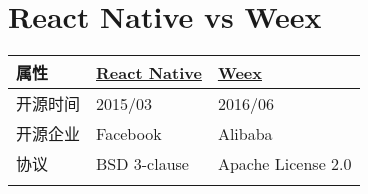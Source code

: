 \section{React Native vs Weex}\label{react-native-vs-weex}

\begin{longtable}[]{@{}lll@{}}
\toprule
\begin{minipage}[b]{0.05\columnwidth}\raggedright\strut
属性\strut
\end{minipage} & \begin{minipage}[b]{0.05\columnwidth}\raggedright\strut
\href{https://github.com/facebook/react-native}{React Native}\strut
\end{minipage} & \begin{minipage}[b]{0.05\columnwidth}\raggedright\strut
\href{https://github.com/apache/incubator-weex/}{Weex}\strut
\end{minipage}\tabularnewline
\midrule
\endhead
\begin{minipage}[t]{0.05\columnwidth}\raggedright\strut
开源时间\strut
\end{minipage} & \begin{minipage}[t]{0.05\columnwidth}\raggedright\strut
2015/03\strut
\end{minipage} & \begin{minipage}[t]{0.05\columnwidth}\raggedright\strut
2016/06\strut
\end{minipage}\tabularnewline
\begin{minipage}[t]{0.05\columnwidth}\raggedright\strut
开源企业\strut
\end{minipage} & \begin{minipage}[t]{0.05\columnwidth}\raggedright\strut
Facebook\strut
\end{minipage} & \begin{minipage}[t]{0.05\columnwidth}\raggedright\strut
Alibaba\strut
\end{minipage}\tabularnewline
\begin{minipage}[t]{0.05\columnwidth}\raggedright\strut
协议\strut
\end{minipage} & \begin{minipage}[t]{0.05\columnwidth}\raggedright\strut
BSD 3-clause\strut
\end{minipage} & \begin{minipage}[t]{0.05\columnwidth}\raggedright\strut
Apache License 2.0\strut
\end{minipage}\tabularnewline
\begin{minipage}[t]{0.05\columnwidth}\raggedright\strut

\end{minipage}
\end{longtable}

